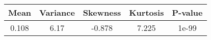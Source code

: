 \begin{tabular}{ccccc}
  \toprule
  \textbf{Mean} & \textbf{Variance} & \textbf{Skewness} & \textbf{Kurtosis} & \textbf{P-value}\\\midrule
  0.108 & 6.17 & -0.878 & 7.225 & 1e-99 \\\bottomrule
\end{tabular}

